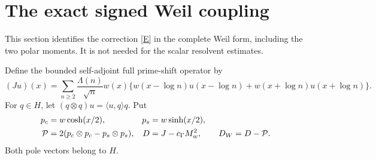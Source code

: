 \documentclass[11pt]{article}
\theoremstyle{remark}
\begin{document}
\section{The exact signed Weil coupling}

This section identifies the correction \eqref{E} in the complete
Weil form, including the two polar moments. It is not needed for
the scalar resolvent estimates.

Define the bounded self-adjoint full prime-shift operator by
\begin{equation}\label{prime}
 (Ju)(x)=\sum_{n\ge2}\frac{\Lambda(n)}{\sqrt n}w(x)
   \{w(x-\log n)u(x-\log n)+w(x+\log n)u(x+\log n)\}.
\end{equation}
For \(q\in H\), let \((q\otimes q)u=\langle u,q\rangle q\).
Put
\begin{align}
 p_c&=w\cosh(x/2),&p_s&=w\sinh(x/2),\notag\\
 \mathcal P&=2(p_c\otimes p_c-p_s\otimes p_s),&
 D&=J-c_\Gamma M_w^2,\qquad D_W=D-\mathcal P.\label{DW}
\end{align}
Both pole vectors belong to \(H\).
\end{document}
